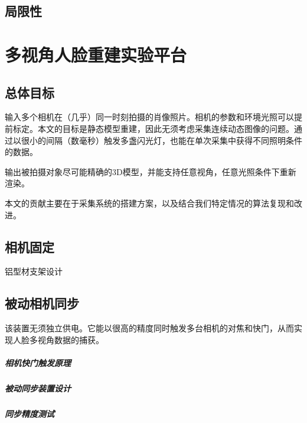\documentclass{scutmaster}
\begin{document}
\section{局限性}

\chapter{多视角人脸重建实验平台}
\label{chap:platform}

\section{总体目标}

输入多个相机在（几乎）同一时刻拍摄的肖像照片。相机的参数和环境光照可以提前标定。本文的目标是静态模型重建，因此无须考虑采集连续动态图像的问题。通过以很小的间隔（数毫秒）触发多盏闪光灯，也能在单次采集中获得不同照明条件的数据。

输出被拍摄对象尽可能精确的3D模型，并能支持任意视角，任意光照条件下重新渲染。

本文的贡献主要在于采集系统的搭建方案，以及结合我们特定情况的算法复现和改进。

\section{相机固定}

铝型材支架设计

\section{被动相机同步}
\label{sec:passive_sync}

该装置无须独立供电。它能以很高的精度同时触发多台相机的对焦和快门，从而实现人脸多视角数据的捕获。

\paragraph{相机快门触发原理}

\paragraph{被动同步装置设计}

\paragraph{同步精度测试}


\end{document}
